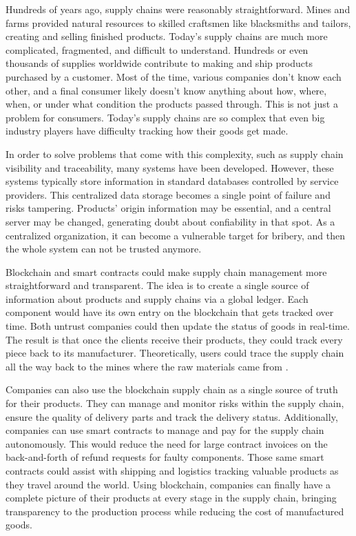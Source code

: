 
\acresetall 

Hundreds of years ago, supply chains were reasonably straightforward. Mines and farms provided natural resources to skilled craftsmen like blacksmiths and tailors, creating and selling finished products. Today's supply chains are much more complicated, fragmented, and difficult to understand. Hundreds or even thousands of supplies worldwide contribute to making and ship products purchased by a customer. Most of the time, various companies don't know each other, and a final consumer likely doesn't know anything about how, where, when, or under what condition the products passed through. This is not just a problem for consumers. Today's supply chains are so complex that even big industry players have difficulty tracking how their goods get made.

In order to solve problems that come with this complexity, such as supply chain visibility and traceability, many systems have been developed. However, these systems typically store information in standard databases controlled by service providers. This centralized data storage becomes a single point of failure and risks tampering. Products' origin information may be essential, and a central server may be changed, generating doubt about confiability in that spot. As a centralized organization, it can become a vulnerable target for bribery, and then the whole system can not be trusted anymore.

Blockchain and smart contracts could make supply chain management more straightforward and transparent. The idea is to create a single source of information about products and supply chains via a global ledger. Each component would have its own entry on the blockchain that gets tracked over time. Both untrust companies could then update the status of goods in real-time. The result is that once the clients receive their products, they could track every piece back to its manufacturer. Theoretically, users could trace the supply chain all the way back to the mines where the raw materials came from \cite{greve2018blockchain}.

Companies can also use the blockchain supply chain as a single source of truth for their products. They can manage and monitor risks within the supply chain, ensure the quality of delivery parts and track the delivery status. Additionally, companies can use smart contracts to manage and pay for the supply chain autonomously. This would reduce the need for large contract invoices on the back-and-forth of refund requests for faulty components. Those same smart contracts could assist with shipping and logistics tracking valuable products as they travel around the world. Using blockchain, companies can finally have a complete picture of their products at every stage in the supply chain, bringing transparency to the production process while reducing the cost of manufactured goods.

